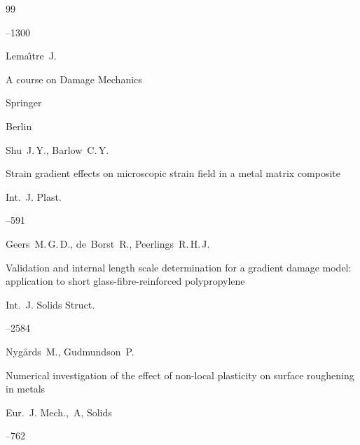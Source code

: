 \begin{thebibliography}{99}


--1300




\by Lema\^{\i}tre~J.

\book A course on Damage Mechanics

\publ Springer

\publaddr Berlin






\by Shu~J.\,Y., Barlow~C.\,Y.

\paper Strain gradient effects on microscopic strain field in a metal matrix composite

\jour Int.~J. Plast.




--591




\by Geers~M.\,G.\,D., de~Borst~R., Peerlings~R.\,H.\,J.

\paper Validation and internal length scale determination for a gradient damage model: application to short glass-fibre-reinforced polypropylene 

\jour Int.~J. Solids Struct.




--2584




\by Nyg\r{a}rds~M., Gudmundson~P.

\paper Numerical investigation of the effect of non-local plasticity on surface roughening in metals

 \jour Eur.~J. Mech.,~A, Solids




 --762

 







\end{thebibliography}
